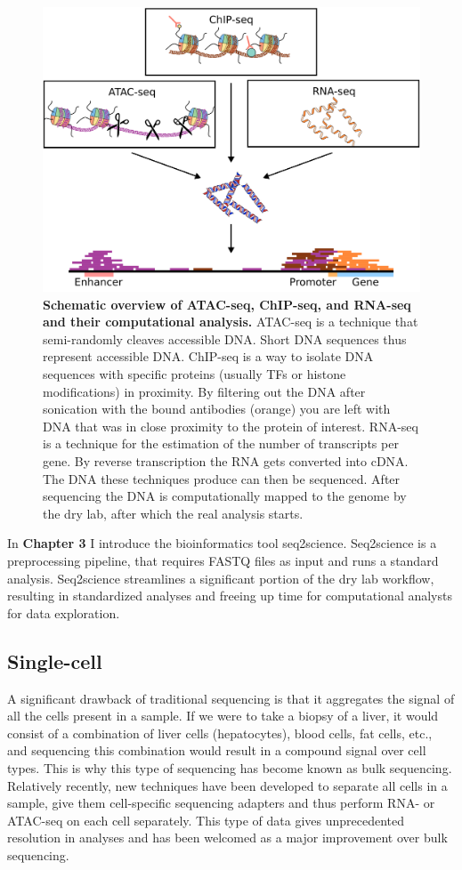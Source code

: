 \begin{figure}
    \center
    \includegraphics[width=0.75\linewidth]{ch.introduction/imgs/analysis.png}
    \caption{\textbf{Schematic overview of ATAC-seq, ChIP-seq, and RNA-seq and their computational analysis.} ATAC-seq is a technique that semi-randomly cleaves accessible DNA. Short DNA sequences thus represent accessible DNA. ChIP-seq is a way to isolate DNA sequences with specific proteins (usually TFs or histone modifications) in proximity. By filtering out the DNA after sonication with the bound antibodies (orange) you are left with DNA that was in close proximity to the protein of interest. RNA-seq is a technique for the estimation of the number of transcripts per gene. By reverse transcription the RNA gets converted into cDNA. The DNA these techniques produce can then be sequenced. After sequencing the DNA is computationally mapped to the genome by the dry lab, after which the real analysis starts. }
    \label{fig:analysis}
\end{figure}

In \textbf{Chapter 3} I introduce the bioinformatics tool seq2science. Seq2science is a preprocessing pipeline, that requires FASTQ files as input and runs a standard analysis. Seq2science streamlines a significant portion of the dry lab workflow, resulting in standardized analyses and freeing up time for computational analysts for data exploration.

\subsection{Single-cell}

A significant drawback of traditional sequencing is that it aggregates the signal of all the cells present in a sample. If we were to take a biopsy of a liver, it would consist of a combination of liver cells (hepatocytes), blood cells, fat cells, etc., and sequencing this combination would result in a compound signal over cell types. This is why this type of sequencing has become known as bulk sequencing. Relatively recently, new techniques have been developed to separate all cells in a sample, give them cell-specific sequencing adapters and thus perform RNA- or ATAC-seq on each cell separately\cite{Buenrostro2015_sc,Tang2009}. This type of data gives unprecedented resolution in analyses and has been welcomed as a major improvement over bulk sequencing.


